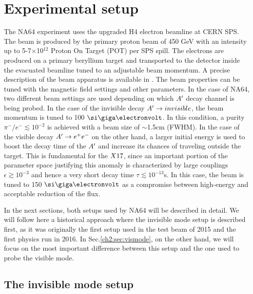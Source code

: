 \clearpage
\newpage

\section{Experimental setup}
\label{ch2:sec:experimental-setup}

The NA64 experiment uses the upgraded H4 electron beamline at CERN SPS. The beam is produced by the primary proton beam of 450 \si{\giga\electronvolt} with an intensity up to 5-7$\times$10$^{12}$ Proton On Target (POT) per SPS spill. The electrons are produced on a primary beryllium target and transported to the detector inside the evacuated beamline tuned to an adjustable beam momentum. A precise description of the beam apparatus is available in \cite{sps-beamline,h4-beamline}. The beam properties can be tuned with the magnetic field settings and other parameters. In the case of NA64, two different beam settings are used depending on which $A'$ decay channel is being probed. In the case of the invisible decay $A'\to invisible$, the beam momentum is tuned to 100 $\gev$. In this condition, a purity $\pi^-/e^- \lesssim 10^{-2}$ is achieved with a beam size of $\sim$1.5\si{cm} (FWHM). In the case of the visible decay $A' \to e^+e^-$ on the other hand, a larger initial energy is used to boost the decay time of the $A'$ and increase its chances of traveling outside the target. This is fundamental for the $X17$, since an important portion of the parameter space justifying this anomaly is characterized by large couplings $\epsilon \gtrsim 10^{-3}$ and hence a very short decay time $\tau \lesssim 10^{-13}$\si{s}. In this case, the beam is tuned to 150 $\gev$ as a compromise between high-energy and acceptable reduction of the flux.

In the next sections, both setups used by NA64 will be described in detail. We will follow here a historical approach where the invisible mode setup is described first, as it was originally the first setup used in the test beam of 2015 and the first physics run in 2016. In Sec.\ref{ch2:sec:vismode}, on the other hand, we will focus on the most important difference between this setup and the one used to probe the visible mode.

\subsection{The invisible mode setup}
\label{ch2:sec:invismode}

